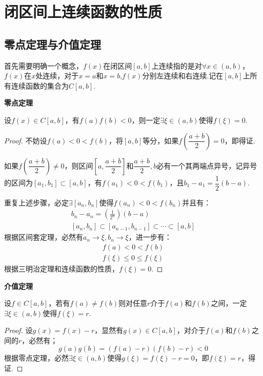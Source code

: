 \section{闭区间上连续函数的性质}
\subsection{零点定理与介值定理}
首先需要明确一个概念，$f(x)$在闭区间$[a,b]$上连续指的是对$\forall x \in (a,b)$，$f(x)$在$x$处连续，对于$x=a$和$x=b$,$f(x)$分别左连续和右连续.记在$[a,b]$上所有连续函数的集合为$C[a,b]$.
\begin{theorem}
    \textbf{零点定理}

    设$f(x) \in C[a,b]$，有$f(a)f(b)<0$，则一定$\exists \xi \in (a,b)$使得$f(\xi)=0$.
\end{theorem}

\begin{proof}
    不妨设$f(a)<0<f(b)$，将$[a,b]$等分，如果$f\left(\dfrac{a+b}{2}\right)=0$，即得证.
    
    如果$f\left(\dfrac{a+b}{2}\right)\neq 0$，则区间$\left[a,\dfrac{a+b}{2}\right]$和$\dfrac{a+b}{2},b$必有一个其两端点异号，记异号的区间为$[a_1, b_1] \subset [a,b]$，有$f(a_1)<0<f(b_1)$，且$b_1-a_1=\dfrac{1}{2}(b-a)$.

    重复上述步骤，必定$\exists [a_n,b_n]$使得$f(a_n)<0<f(b_n)$并且有：
    \begin{gather*}
        b_n-a_n=\left(\frac{1}{2^n}\right)(b-a)\\
        [a_n,b_n]\subset[a_{n-1},b_{n-1}]\subset\cdots\subset[a,b]
    \end{gather*}
    根据区间套定理，必然有$a_n\to\xi,b_n\to\xi$，进一步有：
    \begin{gather*}
        f(a)<0<f(b)\\
        f(\xi)\leqslant 0 \leqslant f(\xi)
    \end{gather*}
    根据三明治定理和连续函数的性质，$f(\xi)=0$.
\end{proof}

\begin{theorem}
    \label{thm:IntermediateValueTheorem}
    \textbf{介值定理}

    设$f \in C[a,b]$，若有$f(a)\neq f(b)$则对任意$r$介于$f(a)$和$f(b)$之间，一定$\exists \xi \in (a,b)$使得$f(\xi)=r$.
\end{theorem}

\begin{proof}
    设$g(x)=f(x)-r$，显然有$g(x) \in C[a,b]$，对介于$f(a)$和$f(b)$之间的$r$，必然有；
    \[g(a)g(b) = (f(a)-r)(f(b)-r)<0\]
    根据零点定理，必然$\exists \xi \in (a,b)$使得$g(\xi)=f(\xi)-r=0$，即$f(\xi)=r$，得证.
\end{proof}

